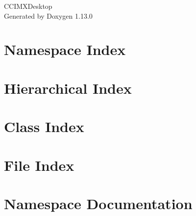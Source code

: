 \documentclass[twoside]{book}
\newcommand{\+}{\discretionary{\mbox{\scriptsize$\hookleftarrow$}}{}{}}
\newcommand{\clearemptydoublepage}{%
    \newpage{\pagestyle{empty}\cleardoublepage}%
  }
\begin{document}
  \raggedbottom
    \hypersetup{pageanchor=false,
                bookmarksnumbered=true,
                pdfencoding=unicode
               }
  \begin{titlepage}
  \vspace*{7cm}
  \begin{center}%
  {\Large CCIMXDesktop}\\
  \vspace*{1cm}
  {\large Generated by Doxygen 1.13.0}\\
  \end{center}
  \end{titlepage}
  \clearemptydoublepage
  \tableofcontents
  \clearemptydoublepage
  \hypersetup{pageanchor=true}




\chapter{Namespace Index}

\chapter{Hierarchical Index}

\chapter{Class Index}

\chapter{File Index}

\chapter{Namespace Documentation}






\end{document}
